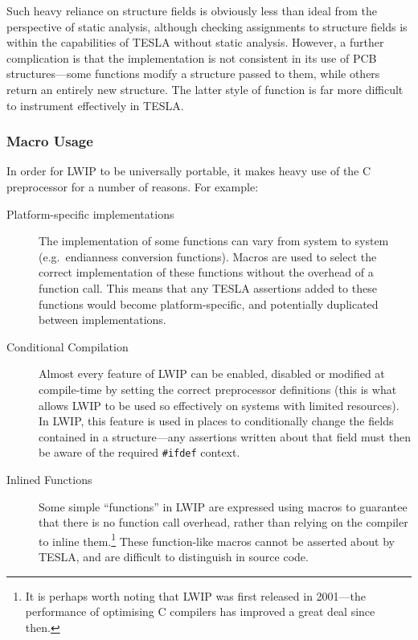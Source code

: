 Such heavy reliance on structure fields is obviously less than ideal
from the perspective of static analysis, although checking assignments
to structure fields is within the capabilities of TESLA without static
analysis. However, a further complication is that the implementation is
not consistent in its use of PCB structures---some functions modify a
structure passed to them, while others return an entirely new structure.
The latter style of function is far more difficult to instrument
effectively in TESLA.

\subsubsection{Macro Usage}

In order for LWIP to be universally portable, it makes heavy use of the
C preprocessor for a number of reasons. For example:
\begin{description}
  \item[Platform-specific implementations] The implementation of some
  functions can vary from system to system (e.g.\ endianness conversion
  functions). Macros are used to select the correct implementation of
  these functions without the overhead of a function call. This means
  that any TESLA assertions added to these functions would become
  platform-specific, and potentially duplicated between implementations.

  \item[Conditional Compilation] Almost every feature of LWIP can be
  enabled, disabled or modified at compile-time by setting the correct
  preprocessor definitions (this is what allows LWIP to be used so
  effectively on systems with limited resources). In LWIP, this feature
  is used in places to conditionally change the fields contained in a
  structure---any assertions written about that field must then be aware
  of the required \texttt{#ifdef} context.

  \item[Inlined Functions] Some simple ``functions'' in LWIP are
  expressed using macros to guarantee that there is no function call
  overhead, rather than relying on the compiler to inline
  them.\footnote{It is perhaps worth noting that LWIP was first released
  in 2001---the performance of optimising C compilers has improved a
  great deal since then.} These function-like macros cannot be asserted
  about by TESLA, and are difficult to distinguish in source code.
\end{description}

